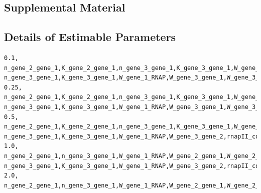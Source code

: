 \documentclass{article}
\begin{document}
\newpage
\begin{landscape}
\section*{Supplemental Material}
\subsection*{Details of Estimable Parameters}
{\tiny
\begin{verbatim}
0.1,
n_gene_2_gene_1,K_gene_2_gene_1,n_gene_3_gene_1,K_gene_3_gene_1,W_gene_1_RNAP,W_gene_2_gene_1,W_gene_2_gene_3,W_gene_3_gene_1,W_gene_3_gene_2,rnapII_concentration,ribosome_concentration,degradation_constant_mRNA,kcat_transcription,kcat_translation,maximum_specific_growth_rate,saturation_constant_translation
n_gene_3_gene_1,K_gene_3_gene_1,W_gene_1_RNAP,W_gene_3_gene_1,W_gene_3_gene_2,rnapII_concentration,degradation_constant_mRNA,kcat_transcription,kcat_translation,maximum_specific_growth_rate
0.25,
n_gene_2_gene_1,K_gene_2_gene_1,n_gene_3_gene_1,K_gene_3_gene_1,W_gene_1_RNAP,W_gene_2_gene_1,W_gene_2_gene_3,W_gene_3_gene_1,W_gene_3_gene_2,rnapII_concentration,ribosome_concentration,degradation_constant_mRNA,kcat_transcription,kcat_translation,maximum_specific_growth_rate,saturation_constant_translation
n_gene_3_gene_1,K_gene_3_gene_1,W_gene_1_RNAP,W_gene_3_gene_1,W_gene_3_gene_2,rnapII_concentration,degradation_constant_mRNA,kcat_transcription,kcat_translation,maximum_specific_growth_rate
0.5,
n_gene_2_gene_1,K_gene_2_gene_1,n_gene_3_gene_1,K_gene_3_gene_1,W_gene_1_RNAP,W_gene_2_gene_1,W_gene_2_gene_3,W_gene_3_gene_1,W_gene_3_gene_2,rnapII_concentration,ribosome_concentration,degradation_constant_mRNA,kcat_transcription,kcat_translation,maximum_specific_growth_rate,saturation_constant_translation
n_gene_3_gene_1,K_gene_3_gene_1,W_gene_1_RNAP,W_gene_3_gene_2,rnapII_concentration,degradation_constant_mRNA,kcat_transcription,kcat_translation,maximum_specific_growth_rate
1.0,
n_gene_2_gene_1,n_gene_3_gene_1,W_gene_1_RNAP,W_gene_2_gene_1,W_gene_2_gene_3,W_gene_3_gene_1,W_gene_3_gene_2,rnapII_concentration,ribosome_concentration,degradation_constant_mRNA,kcat_transcription,kcat_translation,maximum_specific_growth_rate,saturation_constant_translation
n_gene_3_gene_1,K_gene_3_gene_1,W_gene_1_RNAP,W_gene_3_gene_2,rnapII_concentration,degradation_constant_mRNA,kcat_transcription,kcat_translation,maximum_specific_growth_rate
2.0,
n_gene_2_gene_1,n_gene_3_gene_1,W_gene_1_RNAP,W_gene_2_gene_1,W_gene_2_gene_3,W_gene_3_gene_1,W_gene_3_gene_2,rnapII_concentration,ribosome_concentration,degradation_constant_mRNA,kcat_transcription,kcat_translation,maximum_specific_growth_rate

\end{verbatim}}
\end{landscape}
\end{document}
